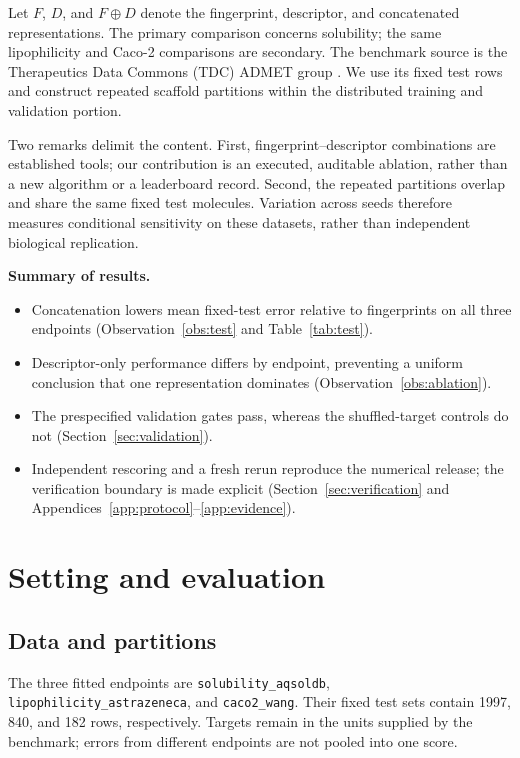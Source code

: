 \documentclass[10pt,twocolumn,a4paper]{article}
\theoremstyle{definition}\newtheorem{observation}{Numerical observation}
\theoremstyle{remark}\newtheorem{remark}{Remark}
\newcommand{\code}[1]{\texttt{\small #1}}
\begin{document}
Let $F$, $D$, and $F\oplus D$ denote the fingerprint, descriptor, and concatenated representations. The primary comparison concerns solubility; the same lipophilicity and Caco-2 comparisons are secondary. The benchmark source is the Therapeutics Data Commons (TDC) ADMET group \cite{tdc}. We use its fixed test rows and construct repeated scaffold partitions within the distributed training and validation portion.

Two remarks delimit the content. First, fingerprint--descriptor combinations are established tools; our contribution is an executed, auditable ablation, rather than a new algorithm or a leaderboard record. Second, the repeated partitions overlap and share the same fixed test molecules. Variation across seeds therefore measures conditional sensitivity on these datasets, rather than independent biological replication.

\noindent\textbf{Summary of results.}
\begin{itemize}
\item Concatenation lowers mean fixed-test error relative to fingerprints on all three endpoints (Observation~\ref{obs:test} and Table~\ref{tab:test}).
\item Descriptor-only performance differs by endpoint, preventing a uniform conclusion that one representation dominates (Observation~\ref{obs:ablation}).
\item The prespecified validation gates pass, whereas the shuffled-target controls do not (Section~\ref{sec:validation}).
\item Independent rescoring and a fresh rerun reproduce the numerical release; the verification boundary is made explicit (Section~\ref{sec:verification} and Appendices~\ref{app:protocol}--\ref{app:evidence}).
\end{itemize}

\section{Setting and evaluation}\label{sec:setting}
\subsection{Data and partitions}
The three fitted endpoints are \code{solubility\_aqsoldb}, \code{lipophilicity\_astrazeneca}, and \code{caco2\_wang}. Their fixed test sets contain 1997, 840, and 182 rows, respectively. Targets remain in the units supplied by the benchmark; errors from different endpoints are not pooled into one score.
\end{document}
